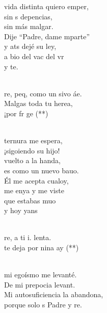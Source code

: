 \documentclass[12pt]{article}
\begin{document}
\begin{multicols*}{2}
\begin{cancion}%
	 vida distinta quiero emper,\\
	sin s depencias,\\
	sin más malgar.\\
	Dije “Padre, dame mparte” \\
	y ats dejé su ley, \\
	a bio del vac del vr \\
	y  te.\\\jump\\
	\begin{chorus}%
	re, peq, como un sivo áe. \\
	Malgas toda tu herea,\\
	¡por fr ge (**) \\
	\end{chorus}%
	\jump\\
	 ternura me espera, \\
	¡sigoiendo su hijo!\\
	vuelto a la handa,\\
	es como un nuevo bauo.\\
	Él me acepta cualoy,\\
	me enya y me viste\\
	que estabas muo \\
	y hoy yans\\\jump\\
	\begin{chorus}%
	re, a ti i.  lenta. \\
	te deja por nina ay (**)\\
	\end{chorus}%
	\jump\\
	mi egoísmo me levanté.\\
	De mi prepocia levant. \\
	Mi autosuficiencia la abandona,  \\
	porque solo s Padre y re. \\
\end{cancion}%


\end{multicols*}
\end{document}
